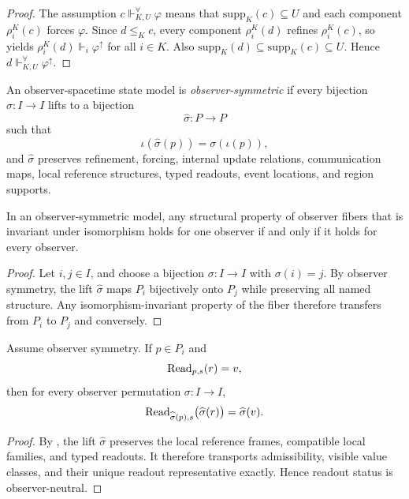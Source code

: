 \begin{proof}
The assumption $c\Vdash^{\forall}_{K,U}\varphi$ means that $\mathrm{supp}_K(c)\subseteq U$ and each component $\rho_i^K(c)$ forces $\varphi$. Since $d\le_K c$, every component $\rho_i^K(d)$ refines $\rho_i^K(c)$, so  yields $\rho_i^K(d)\Vdash_i\varphi^\uparrow$ for all $i\in K$. Also $\mathrm{supp}_K(d)\subseteq \mathrm{supp}_K(c)\subseteq U$. Hence $d\Vdash^{\forall}_{K,U}\varphi^\uparrow$.
\end{proof}

\begin{definition}\label{def:observer-symmetry}
An observer-spacetime state model is \emph{observer-symmetric} if every bijection $\sigma:I\to I$ lifts to a bijection
\[
\widehat{\sigma}:P\to P
\]
such that
\[
\iota(\widehat{\sigma}(p))=\sigma(\iota(p)),
\]
and $\widehat{\sigma}$ preserves refinement, forcing, internal update relations, communication maps, local reference structures, typed readouts, event locations, and region supports.
\end{definition}

\begin{proposition}\label{prop:no-privileged-observer}
In an observer-symmetric model, any structural property of observer fibers that is invariant under isomorphism holds for one observer if and only if it holds for every observer.
\end{proposition}

\begin{proof}
Let $i,j\in I$, and choose a bijection $\sigma:I\to I$ with $\sigma(i)=j$. By observer symmetry, the lift $\widehat{\sigma}$ maps $P_i$ bijectively onto $P_j$ while preserving all named structure. Any isomorphism-invariant property of the fiber therefore transfers from $P_i$ to $P_j$ and conversely.
\end{proof}

\begin{corollary}\label{cor:observer-neutral-readout}
Assume observer symmetry. If $p\in P_i$ and
\[
\mathrm{Read}_{p,s}(r)=v,
\]
then for every observer permutation $\sigma:I\to I$,
\[
\mathrm{Read}_{\widehat{\sigma}(p),s}\bigl(\widehat{\sigma}(r)\bigr)=\widehat{\sigma}(v).
\]
\end{corollary}

\begin{proof}
By , the lift $\widehat{\sigma}$ preserves the local reference frames, compatible local families, and typed readouts. It therefore transports admissibility, visible value classes, and their unique readout representative exactly. Hence readout status is observer-neutral.
\end{proof}

